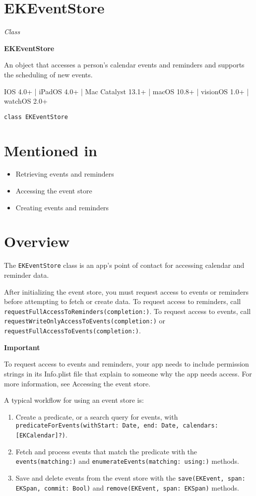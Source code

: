 \documentclass{article}
\title{}
\author{}
\date{}
\begin{document}
\section*{EKEventStore}

\textit{Class}

\textbf{EKEventStore}

An object that accesses a person's calendar events and reminders and supports the scheduling of new events.

IOS 4.0+ | iPadOS 4.0+ | Mac Catalyst 13.1+ | macOS 10.8+ | visionOS 1.0+ | watchOS 2.0+

\texttt{class EKEventStore}

\section*{Mentioned in}

\begin{itemize}
    \item Retrieving events and reminders
    \item Accessing the event store
    \item Creating events and reminders
\end{itemize}

\section*{Overview}

The \texttt{EKEventStore} class is an app's point of contact for accessing calendar and reminder data.

After initializing the event store, you must request access to events or reminders before attempting to fetch or create data. To request access to reminders, call \texttt{requestFullAccessToReminders(completion:)}. To request access to events, call \texttt{requestWriteOnlyAccessToEvents(completion:)} or \texttt{requestFullAccessToEvents(completion:)}.

\textbf{Important}

To request access to events and reminders, your app needs to include permission strings in its Info.plist file that explain to someone why the app needs access. For more information, see Accessing the event store.

A typical workflow for using an event store is:

\begin{enumerate}
    \item Create a predicate, or a search query for events, with \texttt{predicateForEvents(withStart: Date, end: Date, calendars: [EKCalendar]?)}.
    \item Fetch and process events that match the predicate with the \texttt{events(matching:)} and \texttt{enumerateEvents(matching: using:)} methods.
    \item Save and delete events from the event store with the \texttt{save(EKEvent, span: EKSpan, commit: Bool)} and \texttt{remove(EKEvent, span: EKSpan)} methods.
\end{enumerate}
\end{document}
